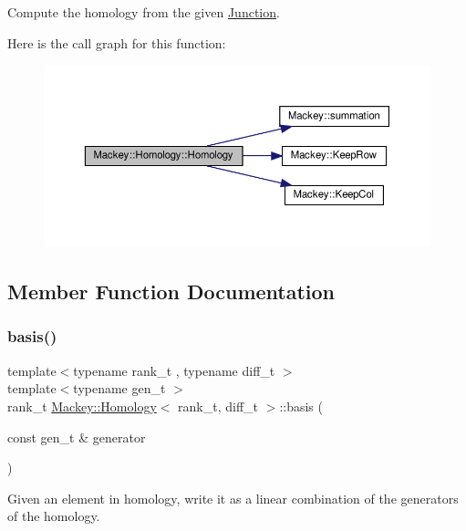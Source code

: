 Compute the homology from the given \hyperlink{classMackey_1_1Junction}{Junction}. 

Here is the call graph for this function\+:\nopagebreak
\begin{figure}[H]
\begin{center}
\leavevmode
\includegraphics[width=350pt]{classMackey_1_1Homology_a31e26f0fb8e1cd7f0506ae1dbc97ea22_cgraph}
\end{center}
\end{figure}


\subsection{Member Function Documentation}
\mbox{\label{classMackey_1_1Homology_a3ef6bc9a9859c3711c11d153ba55b3e1}} 
\subsubsection{\texorpdfstring{basis()}{basis()}}
{\footnotesize\ttfamily template$<$typename rank\+\_\+t , typename diff\+\_\+t $>$ \\
template$<$typename gen\+\_\+t $>$ \\
rank\+\_\+t \hyperlink{classMackey_1_1Homology}{Mackey\+::\+Homology}$<$ rank\+\_\+t, diff\+\_\+t $>$\+::basis (\begin{DoxyParamCaption}\item[{const gen\+\_\+t \&}]{generator }\end{DoxyParamCaption})}



Given an element in homology, write it as a linear combination of the generators of the homology. 

